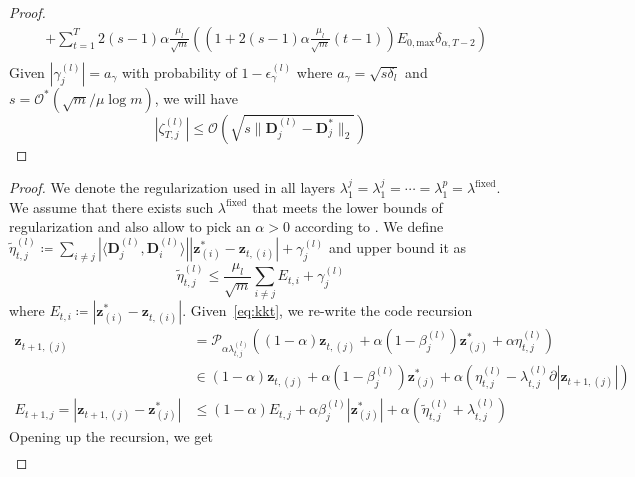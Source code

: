 \documentclass[10pt]{article} %
\newcommand{\D}{{\bm D}}
\newcommand{\z}{{\bm z}}
\newcommand{\prox}{\mathcal{P}}
\begin{document}
\begin{proof}
\begin{equation}
\begin{aligned}
&+ \sum_{t=1}^T 2 (s-1) \alpha \frac{\mu_l}{\sqrt{m}} ((1 + 2 (s-1) \alpha \frac{\mu_l}{\sqrt{m}} (t-1)) E_{0, \text{max}} \delta_{\alpha, T-2})\\
\end{aligned}
\end{equation}
Given $| \gamma_j^{(l)} | = a_{\gamma}$ with probability of $1 - \epsilon_{\gamma}^{(l)}$ where $a_{\gamma} = \sqrt{s \delta_l}$ and $s = \mathcal{O}^{\ast}(\sqrt{m} / \mu \log{m})$, we will have
\begin{equation}
    | \zeta_{T,j}^{(l)} | \leq \mathcal{O}(\sqrt{s \| \D_j^{(l)} - \D_j^{\ast} \|_2})
\end{equation}

\end{proof}
%
%
\fwdzerrorfixed*
%
\begin{proof}
We denote the regularization used in all layers $\lambda_1^j = \lambda_1^j = \cdots = \lambda_1^p = \lambda^{\text{fixed}}$. We assume that there exists such $\lambda^{\text{fixed}}$ that meets the lower bounds of regularization and also allow to pick an $\alpha >0$ according to . We define $\tilde \eta_{t,j}^{(l)} \coloneqq \sum_{i \neq j} | \langle \D_j^{(l)}, \D_i^{(l)} \rangle | | \z^{\ast}_{(i)} - \z_{t, (i)} | + \gamma_j^{(l)}$ and upper bound it as
\begin{equation}\label{eq:tildeeta_2}
\tilde \eta_{t,j}^{(l)} \leq \frac{\mu_l}{\sqrt{m}} \sum_{i \neq j} E_{t,i} + \gamma_j^{(l)}
\end{equation}
where $E_{t,i} \coloneqq |\z_{(i)}^{\ast}  - \z_{t,(i)}|$. Given~\eqref{eq:kkt}, we re-write the code recursion
\begin{equation}
\begin{aligned}
\z_{t+1, (j)} &= \prox_{\alpha \lambda_{t,j}^{(l)}}((1 - \alpha) \z_{t, (j)} + \alpha (1 - \beta_j^{(l)}) \z^{\ast}_{(j)} + \alpha \eta_{t,j}^{(l)})\\
&\in (1 - \alpha) \z_{t, (j)} + \alpha (1 - \beta_j^{(l)}) \z^{\ast}_{(j)} + \alpha (\eta_{t,j}^{(l)} - \lambda_{t,j}^{(l)} \partial | \z_{t+1, (j)} |)\\
E_{t+1, j} = | \z_{t+1, (j)} - \z_{(j)}^{\ast} | &\leq (1 - \alpha) E_{t, j} + \alpha \beta_j^{(l)} | \z^{\ast}_{(j)} | + \alpha (\tilde \eta_{t,j}^{(l)} + \lambda_{t,j}^{(l)} )
\end{aligned}
\end{equation}
Opening up the recursion, we get
\begin{equation}
\begin{aligned}

\end{aligned}
\end{equation}
\end{proof}
\end{document}
